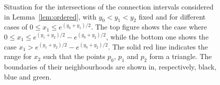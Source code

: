 \begin{figure}[!t]
\caption{Situation for the intersections of the connection intervals considered in Lemma~\ref{lem:ordered}, with $y_0 < y_1 <y_2$ fixed and for different cases of $0 \le x_1 \le e^{(y_0 + y_1)/2}$. The top figure shows the case where $0 \le x_1 \le e^{(y_1 + y_2)/2} - e^{(y_0 + y_2)/2}$, while the bottom one shows the case $x_1 > e^{(y_1 + y_2)/2} - e^{(y_0 + y_2)/2}$. The solid red line indicates the range for $x_2$ such that the points $p_0$, $p_1$ and $p_2$ form a triangle. The boundaries of their neighbourhoods are shown in, respectively, black, blue and green.}
\label{fig:triangle_prob_lemma}
\end{figure}

